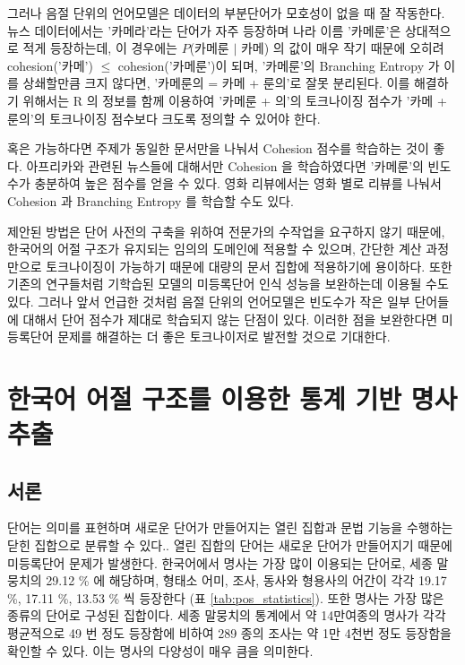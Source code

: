 \documentclass[oneside, ko,phd]{snuthesis_utf8_kor}
\begin{document}
그러나 음절 단위의 언어모델은 데이터의 부분단어가 모호성이 없을 때 잘 작동한다.
뉴스 데이터에서는 '카메라'라는 단어가 자주 등장하며 나라 이름 '카메룬'은 상대적으로 적게 등장하는데, 이 경우에는 $P$(카메룬 $\vert$ 카메) 의 값이 매우 작기 때문에 오히려 cohesion('카메') $\le$ cohesion('카메룬')이 되며, '카메룬'의 Branching Entropy 가 이를 상쇄할만큼 크지 않다면, '카메룬의 = 카메 + 룬의'로 잘못 분리된다.
이를 해결하기 위해서는 R 의 정보를 함께 이용하여 '카메룬 + 의'의 토크나이징 점수가 '카메 + 룬의'의 토크나이징 점수보다 크도록 정의할 수 있어야 한다.

혹은 가능하다면 주제가 동일한 문서만을 나눠서 Cohesion 점수를 학습하는 것이 좋다.
아프리카와 관련된 뉴스들에 대해서만 Cohesion 을 학습하였다면 '카메룬'의 빈도수가 충분하여 높은 점수를 얻을 수 있다.
영화 리뷰에서는 영화 별로 리뷰를 나눠서 Cohesion 과 Branching Entropy 를 학습할 수도 있다.

제안된 방법은 단어 사전의 구축을 위하여 전문가의 수작업을 요구하지 않기 때문에, 한국어의 어절 구조가 유지되는 임의의 도메인에 적용할 수 있으며, 간단한 계산 과정만으로 토크나이징이 가능하기 때문에 대량의 문서 집합에 적용하기에 용이하다.
또한 기존의 \cite{zhao2007incorporating, zhao2011integrating, zheng2013deep} 연구들처럼 기학습된 모델의 미등록단어 인식 성능을 보완하는데 이용될 수도 있다.
그러나 앞서 언급한 것처럼 음절 단위의 언어모델은 빈도수가 작은 일부 단어들에 대해서 단어 점수가 제대로 학습되지 않는 단점이 있다.
이러한 점을 보완한다면 미등록단어 문제를 해결하는 더 좋은 토크나이저로 발전할 것으로 기대한다.


\newpage
\chapter{한국어 어절 구조를 이용한 통계 기반 명사 추출} \label{noun_extraction}

\section{서론}

단어는 의미를 표현하며 새로운 단어가 만들어지는 열린 집합과 문법 기능을 수행하는 닫힌 집합으로 분류할 수 있다.\cite{jurafsky2000speech}.
열린 집합의 단어는 새로운 단어가 만들어지기 때문에 미등록단어 문제가 발생한다.
한국어에서 명사는 가장 많이 이용되는 단어로, 세종 말뭉치의 29.12 \% 에 해당하며, 형태소 어미, 조사, 동사와 형용사의 어간이 각각 19.17 \%, 17.11 \%, 13.53 \% 씩 등장한다 (표 \ref{tab:pos_statistics}).
또한 명사는 가장 많은 종류의 단어로 구성된 집합이다.
세종 말뭉치의 통계에서 약 14만여종의 명사가 각각 평균적으로 49 번 정도 등장함에 비하여 289 종의 조사는 약 1만 4천번 정도 등장함을 확인할 수 있다.
이는 명사의 다양성이 매우 큼을 의미한다.
\end{document}
